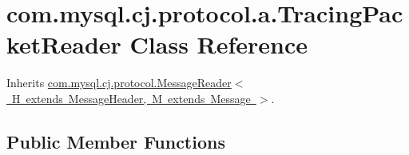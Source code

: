 \hypertarget{classcom_1_1mysql_1_1cj_1_1protocol_1_1a_1_1_tracing_packet_reader}{}\section{com.\+mysql.\+cj.\+protocol.\+a.\+Tracing\+Packet\+Reader Class Reference}
\label{classcom_1_1mysql_1_1cj_1_1protocol_1_1a_1_1_tracing_packet_reader}


Inherits \mbox{\hyperlink{interfacecom_1_1mysql_1_1cj_1_1protocol_1_1_message_reader}{com.\+mysql.\+cj.\+protocol.\+Message\+Reader$<$ H extends Message\+Header, M extends Message $>$}}.

\subsection*{Public Member Functions}
